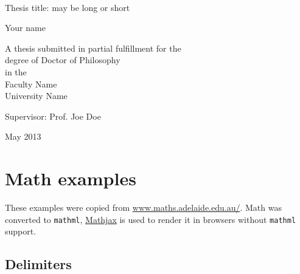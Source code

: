 \documentclass[11pt,a4paper,oldfontcommands]{memoir}
\begin{document}
%
%
\thispagestyle{empty}

{%
\sffamily
\centering
\Large

~\vspace{\fill}

{\huge 
Thesis title: may be long or short
}

\vspace{2.5cm}

{\LARGE
Your name
}

\vspace{3.5cm}

A thesis submitted in partial fulfillment for the\\
degree of Doctor of Philosophy\\[1em]
in the\\[1em]
Faculty Name\\
University Name

\vspace{3.5cm}

Supervisor: Prof. Joe Doe

\vspace{\fill}

May 2013

}%

\cleardoublepage


\tableofcontents*


\clearpage

\chapter{Math examples}

These examples were copied from 
\href{http://www.maths.adelaide.edu.au/anthony.roberts/LaTeX/Src/maths.tex}{www.maths.adelaide.edu.au/}. 
Math was converted to \texttt{mathml}, \href{https://www.mathjax.org/}{Mathjax}
is used to render it in browsers without \texttt{mathml} support.

\section{Delimiters}
\end{document}
